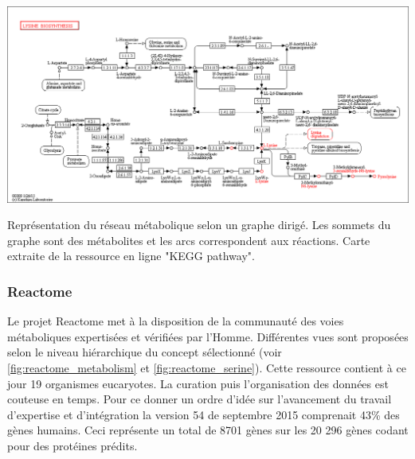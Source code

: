 \begin{refsegment}
    \begin{shadedfigure}[H]
        \centering
        \includegraphics[width=\textwidth]{img/kegg_lysine.png}
        \caption{ Représentation du réseau métabolique selon un graphe dirigé. Les sommets du graphe sont des métabolites et les arcs correspondent aux réactions. Carte extraite de la ressource en ligne "KEGG pathway". }
        \label{fig:kegg_lysine}
    \end{shadedfigure}
    
    \subsubsection{Reactome}
    Le projet Reactome \cite{joshi2005reactome,matthews2009reactome,croft2010reactome,croft2014reactome,fabregat2016reactome} met à la disposition de la communauté des voies métaboliques expertisées et vérifiées par l'Homme. Différentes vues sont proposées selon le niveau hiérarchique du concept sélectionné (voir \cref{fig:reactome_metabolism} et \cref{fig:reactome_serine}). Cette ressource contient à ce jour 19 organismes eucaryotes. La curation puis l'organisation des données est couteuse en temps. Pour ce donner un ordre d'idée sur l'avancement du travail d'expertise et d'intégration la version 54 de septembre 2015 comprenait 43\% des gènes humains. Ceci représente un total de 8701 gènes sur les 20 296 gènes codant pour des protéines prédits.
    

\end{refsegment}

